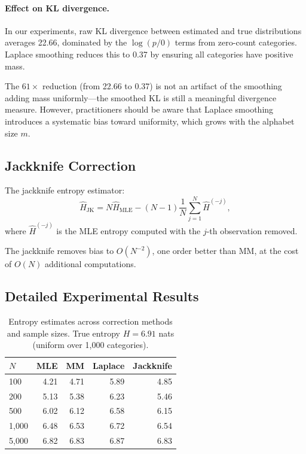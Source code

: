 \documentclass[11pt,a4paper]{article}
\begin{document}
\paragraph{Effect on KL divergence.}
In our experiments, raw KL divergence between estimated and
true distributions averages 22.66, dominated by the
$\log(p/0)$ terms from zero-count categories.  Laplace
smoothing reduces this to 0.37 by ensuring all categories
have positive mass.

The $61\times$ reduction (from 22.66 to 0.37) is not an
artifact of the smoothing adding mass uniformly---the
smoothed KL is still a meaningful divergence measure.
However, practitioners should be aware that Laplace
smoothing introduces a systematic bias toward uniformity,
which grows with the alphabet size $m$.

\subsection{Jackknife Correction}

The jackknife entropy estimator:
\begin{equation}
  \hat{H}_{\mathrm{JK}} = N\hat{H}_{\mathrm{MLE}}
  - (N-1)\frac{1}{N}\sum_{j=1}^N \hat{H}^{(-j)},
\end{equation}
where $\hat{H}^{(-j)}$ is the MLE entropy computed with
the $j$-th observation removed.

The jackknife removes bias to $O(N^{-2})$, one order
better than MM, at the cost of $O(N)$ additional
computations.

\subsection{Detailed Experimental Results}

\begin{table}[h]
\centering
\caption{Entropy estimates across correction methods
and sample sizes.  True entropy $H = 6.91$ nats
(uniform over 1{,}000 categories).}
\label{tab:entropy_detail}
\begin{tabular}{@{}lrrrr@{}}
\toprule
$N$ & MLE & MM & Laplace & Jackknife \\
\midrule
100   & 4.21 & 4.71 & 5.89 & 4.85 \\
200   & 5.13 & 5.38 & 6.23 & 5.46 \\
500   & 6.02 & 6.12 & 6.58 & 6.15 \\
1{,}000 & 6.48 & 6.53 & 6.72 & 6.54 \\
5{,}000 & 6.82 & 6.83 & 6.87 & 6.83 \\
\bottomrule
\end{tabular}
\end{table}
\end{document}
